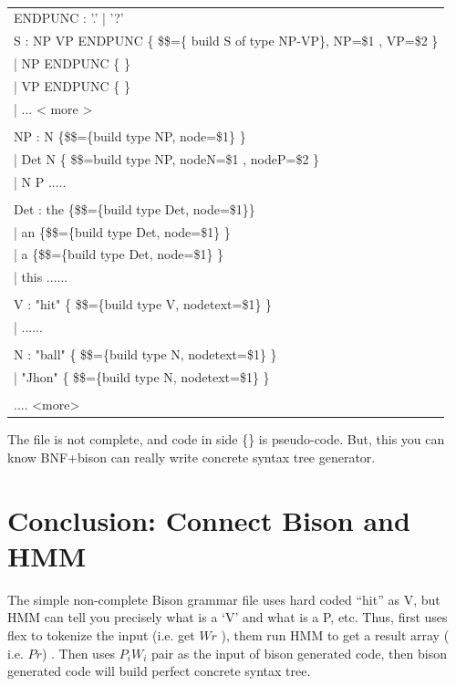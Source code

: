 \setlength{\parwidth}{\linewidth}%
\addtolength{\parwidth}{-1.5\parindent}%
\begin{flushright} \tt
\begin{longtable}{|m{\parwidth}|}\hline

ENDPUNC : '.' | '?'  \\

S : NP VP ENDPUNC \{ \$\$=\{ build S of type NP-VP\}, NP=\$1 , VP=\$2   \}\\
	\qquad	| NP ENDPUNC \{  \}\\
	\qquad	| VP ENDPUNC  \{  \}\\
	\qquad	| ...  < more >  \\ 
\\
NP : N \{\$\$=\{build type NP, node=\$1\} \} \\
\qquad	| Det N \{ \$\$={build type NP, nodeN=\$1 , nodeP=\$2} \} \\
\qquad	| N P ..... \\ 
\\
Det : the  \{\$\$=\{build type Det, node=\$1\}\} \\
\qquad	| an  \{\$\$=\{build type Det, node=\$1\} \} \\
\qquad	| a \{\$\$=\{build type Det, node=\$1\} \} \\
\qquad	| this ...... \\
\\
V : "hit"  \{ \$\$=\{build type V, nodetext=\$1\} \} \\
\qquad	| ...... \\
\\
N : "ball" \{ \$\$=\{build type N, nodetext=\$1\} \} \\
\qquad	| "Jhon" \{ \$\$=\{build type N, nodetext=\$1\} \}  \\
\\
.... <more> \\
\end{longtable}
\end{flushright}

The file is not complete, and code in side \{\} is pseudo-code. But, this you can know BNF+bison 
can really write concrete syntax tree generator. 

\section{Conclusion: Connect Bison and HMM}

The simple non-complete Bison grammar file uses hard coded ``hit'' as V, but HMM can tell you  precisely what is a `V'  and what is a P, etc. Thus, first uses flex to tokenize the input (i.e. get $Wr$ ), them run HMM to get a result array ( i.e. $Pr$) . Then uses $P_{i}W_i$ pair as the
input of bison generated code, then bison generated code will build perfect concrete syntax tree.

